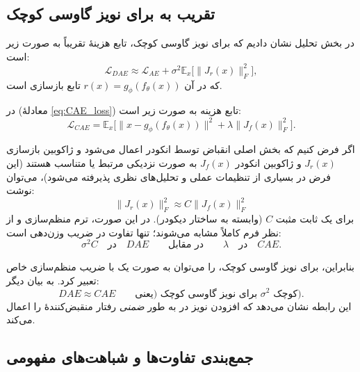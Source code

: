 \documentclass{article}
\begin{document}
\subsection{تقریب  به  برای نویز گاوسی کوچک}

در بخش تحلیل  نشان دادیم که برای نویز گاوسی کوچک، تابع هزینهٔ  تقریباً به صورت زیر است:
\begin{equation}
	\mathcal{L}_{DAE}
	\approx
	\mathcal{L}_{AE}
	+
	\sigma^2
	\mathbb{E}_{x}
	\big[
	\|J_r(x)\|_F^2
	\big],
\end{equation}
که در آن $r(x) = g_\phi(f_\theta(x))$ تابع بازسازی است.

در  (معادلهٔ \eqref{eq:CAE_loss}) تابع هزینه به صورت زیر است:
\begin{equation}
	\mathcal{L}_{CAE}
	=
	\mathbb{E}_{x}
	\Big[
	\|x - g_\phi(f_\theta(x))\|^2
	+
	\lambda \|J_f(x)\|_F^2
	\Big].
\end{equation}

اگر فرض کنیم که بخش اصلی انقباض توسط انکودر اعمال می‌شود و ژاکوبین بازسازی $J_r(x)$ و ژاکوبین انکودر $J_f(x)$ به صورت نزدیکی مرتبط یا متناسب هستند (این فرض در بسیاری از تنظیمات عملی و تحلیل‌های نظری پذیرفته می‌شود)، می‌توان نوشت:
\begin{equation}
	\|J_r(x)\|_F^2 \approx C \|J_f(x)\|_F^2
\end{equation}
برای یک ثابت مثبت $C$ (وابسته به ساختار دیکودر). در این صورت، ترم منظم‌سازی  و  از نظر فرم کاملاً مشابه می‌شوند؛ تنها تفاوت در ضریب وزن‌دهی است:
\begin{equation}
	\sigma^2 {C} \quad \text{در} \quad DAE
	\qquad \text{در مقابل} \qquad
	\lambda \quad \text{در} \quad CAE.
\end{equation}

بنابراین، برای نویز گاوسی کوچک،  را می‌توان به صورت یک  با ضریب منظم‌سازی خاص تعبیر کرد. به بیان دیگر:
\begin{equation}
	DAE \approx CAE
	\qquad
	\text{برای نویز گاوسی کوچک (یعنی $\sigma^2$ کوچک).}
\end{equation}
این رابطه نشان می‌دهد که افزودن نویز در  به طور \emph{ضمنی} رفتار منقبض‌کنندهٔ  را اعمال می‌کند.

\subsection{جمع‌بندی تفاوت‌ها و شباهت‌های مفهومی}
\end{document}
